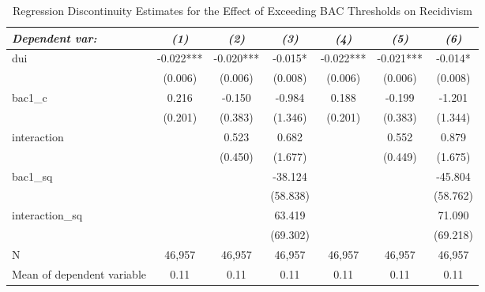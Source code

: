 \begin{table}[htbp]\centering
\small
\caption{Regression Discontinuity Estimates for the Effect of Exceeding BAC Thresholds on Recidivism}
\begin{center}
\begin{threeparttable}
\begin{tabular}{l*{6}{c}}
\toprule
\multicolumn{1}{l}{\textit{Dependent var: }}&
\multicolumn{1}{c}{\textit{(1)}}&
\multicolumn{1}{c}{\textit{(2)}}&
\multicolumn{1}{c}{\textit{(3)}}&
\multicolumn{1}{c}{\textit{(4)}}&
\multicolumn{1}{c}{\textit{(5)}}&
\multicolumn{1}{c}{\textit{(6)}}\\
\midrule
dui                 &      -0.022***&      -0.020***&      -0.015*  &      -0.022***&      -0.021***&      -0.014*  \\
                    &     (0.006)   &     (0.006)   &     (0.008)   &     (0.006)   &     (0.006)   &     (0.008)   \\
bac1\_c              &       0.216   &      -0.150   &      -0.984   &       0.188   &      -0.199   &      -1.201   \\
                    &     (0.201)   &     (0.383)   &     (1.346)   &     (0.201)   &     (0.383)   &     (1.344)   \\
interaction         &               &       0.523   &       0.682   &               &       0.552   &       0.879   \\
                    &               &     (0.450)   &     (1.677)   &               &     (0.449)   &     (1.675)   \\
bac1\_sq             &               &               &     -38.124   &               &               &     -45.804   \\
                    &               &               &    (58.838)   &               &               &    (58.762)   \\
interaction\_sq      &               &               &      63.419   &               &               &      71.090   \\
                    &               &               &    (69.302)   &               &               &    (69.218)   \\
\midrule
N                   &      46,957   &      46,957   &      46,957   &      46,957   &      46,957   &      46,957   \\
Mean of dependent variable&        0.11   &        0.11   &        0.11   &        0.11   &        0.11   &        0.11   \\
\bottomrule

\end{tabular}
\end{threeparttable}
\end{center}
\end{table}
